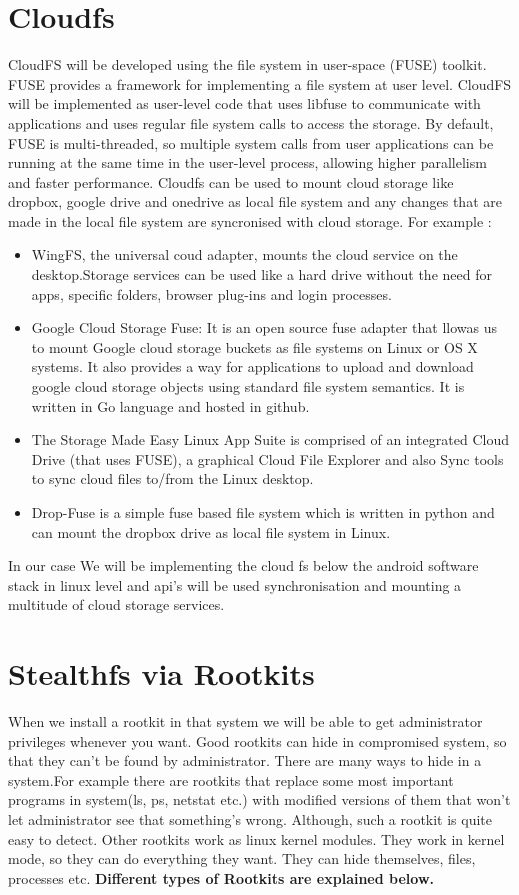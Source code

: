 \section{Cloudfs}
CloudFS will be developed using the file system in user-space (FUSE) toolkit. FUSE provides a framework for implementing a file system at user level.  CloudFS will be implemented  as user-level code that uses libfuse to communicate with  applications  and uses regular file system calls  to access the storage. By default, FUSE is multi-threaded, so multiple system calls from user applications can be running at the same time in the user-level process, allowing higher parallelism and  faster performance. Cloudfs can be used to mount cloud storage like dropbox, google drive and onedrive as local file system and any changes that are made in the local file system are syncronised with cloud storage. For example :
\begin{itemize}
\item WingFS, the universal coud adapter, mounts the cloud service on the desktop.Storage services can be used  like a hard drive without the need for apps, specific folders, browser plug-ins and login processes.
\item Google Cloud Storage Fuse: It is an open source fuse adapter that llowas us to mount Google cloud storage buckets as file systems on Linux or OS X systems. It also provides a way for applications to upload and download google cloud storage objects using standard file system semantics. It is written in Go language and hosted in github.
\item The Storage Made Easy Linux App Suite is comprised of an integrated Cloud Drive (that uses FUSE), a graphical Cloud File Explorer and also Sync tools to sync cloud files to/from the Linux desktop.
\item Drop-Fuse is a simple fuse based file system which is written in python and can mount the dropbox drive as local file system in Linux.


\end{itemize}
In our case We will be implementing the cloud fs below the android software stack in linux level and api's will be used synchronisation and mounting a multitude of cloud storage services.
\section{Stealthfs via Rootkits}
When we  install a rootkit in that system we will be able to get administrator privileges whenever you want. Good rootkits can hide in compromised system, so that they can't be found by administrator. There are many ways to hide in a system.For example there are rootkits that replace some most important programs in system(ls, ps, netstat etc.) with modified versions of them that won't let administrator see that something's wrong. Although, such a rootkit is quite easy to detect. Other rootkits work as linux kernel modules. They work in kernel mode, so they can do everything they want. They can hide themselves, files, processes etc.
\linebreak 
\textbf{Different types of Rootkits are explained below.}
